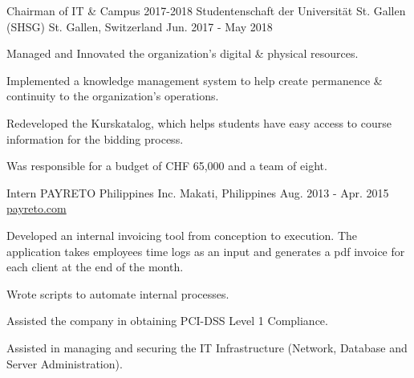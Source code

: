 \begin{cventries}
  \cventry
    {Chairman of IT \& Campus 2017-2018} %
    {Studentenschaft der Universität St. Gallen (SHSG)} %
    {St. Gallen, Switzerland} %
    {Jun. 2017 - May 2018} %
    {} %
    {
      \begin{cvitems} %
        \item {Managed and Innovated the organization's digital \& physical resources.}
        \item {Implemented a knowledge management system to help create permanence \& continuity to the organization's operations.}
        \item {Redeveloped the Kurskatalog, which helps students have easy access to course information for the bidding process.}
        \item {Was responsible for a budget of CHF 65,000 and a team of eight.}
      \end{cvitems}
    }
  \cventry
    {Intern} %
    {PAYRETO Philippines Inc.} %
    {Makati, Philippines} %
    {Aug. 2013 - Apr. 2015} %
    {\href{https://payreto.com}{payreto.com}} %
    {
      \begin{cvitems} %
        \item {Developed an internal invoicing tool from conception to execution. The application takes employees time logs as an input and generates a pdf invoice for each client at the end of the month.}
        \item {Wrote scripts to automate internal processes.}
        \item {Assisted the company in obtaining PCI-DSS Level 1 Compliance.}
        \item {Assisted in managing and securing the IT Infrastructure (Network, Database and Server Administration).}

\end{cvitems}}
\end{cventries}
